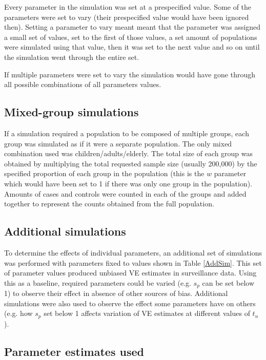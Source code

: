 \documentclass[11pt]{article}
\begin{document}
Every parameter in the simulation was set at a prespecified value. Some of the parameters were set to vary (their prespecified value would have been ignored then). Setting a parameter to vary meant meant that the parameter was assigned a small set of values, set to the first of those values, a set amount of populations were simulated using that value, then it was set to the next value and so on until the simulation went through the entire set.

If multiple parameters were set to vary the simulation would have gone through all possible combinations of all parameters values.

\subsection{Mixed-group simulations}

If a simulation required a population to be composed of multiple groups, each group was simulated as if it were a separate population. The only mixed combination used was children/adults/elderly. The total size of each group was obtained by multiplying the total requested sample size (usually 200,000) by the specified proportion of each group in the population (this is the $w$ parameter which would have been set to 1 if there was only one group in the population). Amounts of cases and controls were counted in each of the groups and added together to represent the counts obtained from the full population.

\subsection{Additional simulations}

To determine the effects of individual parameters, an additional set of simulations was performed with parameters fixed to values shown in Table \ref{AddSim}. This set of parameter values produced unbiased VE estimates in surveillance data. Using this as a baseline, required parameters could be varied (e.g. $s_p$ can be set below 1) to observe their effect in absence of other sources of bias. Additional simulations were also used to observe the effect some parameters have on others (e.g. how $s_p$ set below 1 affects variation of VE estimates at different values of $t_n$).

\pagebreak
\subsection{Parameter estimates used}
\end{document}

